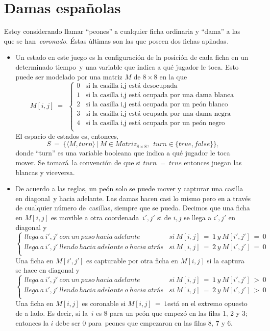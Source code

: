\documentclass[paper=letter, fontsize=12pt]{scrartcl} %
\numberwithin{equation}{section} %
\numberwithin{figure}{section} %
\numberwithin{table}{section} %
\begin{document}
\section{Damas españolas}

Estoy considerando llamar ``peones'' a cualquier ficha ordinaria y ``dama'' a las que se han\
\textit{coronado}. Éstas últimas son las que poseen dos fichas apiladas.

\begin{itemize}
\item Un estado en este juego es la configuración de la posición de cada ficha en un determinado tiempo\
  y una variable que indica a qué jugador le toca. Esto puede ser modelado por una matriz $M$ de $8 \times 8$ en la que
  \[M[i,j]\ =\ \
  \begin{cases}
    0 & \text{si\ la\ casilla\ i,j\ está\ desocupada}\\
    1 & \text{si\ la\ casilla\ i,j\ está\ ocupada por una dama blanca}\\
    2 & \text{si\ la\ casilla\ i,j\ está\ ocupada por un peón blanco}\\
    3 & \text{si\ la\ casilla\ i,j\ está\ ocupada por una dama negra}\\
    4 & \text{si\ la\ casilla\ i,j\ está\ ocupada por un peón negro}\\
  \end{cases}
  \]
  El espacio de estados es, entonces,
  \[S\ =\ \{\langle M,turn \rangle\ |\ M \in Matriz_{8 \times 8},\ \
  turn \in \{true,false\}\},
  \]
  donde ``turn'' es una variable booleana que indica a qué jugador le toca mover. Se tomará\
  la convención de que si $turn\ =\ true$ entonces juegan las blancas y viceversa.
\item De acuerdo a las reglas, un peón solo se puede mover y capturar una casilla en diagonal\
  y hacia adelante. Las damas hacen casi lo mismo pero en a través de cualquier número de\
  casillas, siempre que se pueda. Decimos que una ficha en $M[i,j]$ es movible a otra coordenada\
  $i',j'$ si de $i,j$ se llega a $i',j'$ en diagonal y
  \[
  \begin{cases}
    llega\ a\ i',j'\ con\ un\ paso\ hacia\ adelante & si\ M[i,j]\ =\ 1\ y\ M[i',j']\ =\ 0\\
    llega\ a\ i',j'\ llendo\ hacia\ adelante\ o\ hacia\ atrás & si\ M[i,j]\ =\ 2\ y\ M[i',j']\ =\ 0\\
  \end{cases}
  \]
  Una ficha en $M[i',j']$ es capturable por otra ficha en $M[i,j]$ si la captura se hace en diagonal y
  \[
  \begin{cases}
    llega\ a\ i',j'\ con\ un\ paso\ hacia\ adelante & si\ M[i,j]\ =\ 1\ y\ M[i',j']\ >\ 0\\
    llega\ a\ i',j'\ llendo\ hacia\ adelante\ o\ hacia\ atrás & si\ M[i,j]\ =\ 2\ y\ M[i',j']\ >\ 0\\
  \end{cases}
  \]
  Una ficha en $M[i,j]$ es coronable si $M[i,j]\ =\ 1$está en el extremo opuesto de a lado. Es decir, si la\
  $i$ es 8 para un peón que empezó en las filas 1, 2 y 3; entonces la $i$ debe ser 0 para\
  peones que empezaron en las filas 8, 7 y 6.\par
  

\end{itemize}
\end{document}
